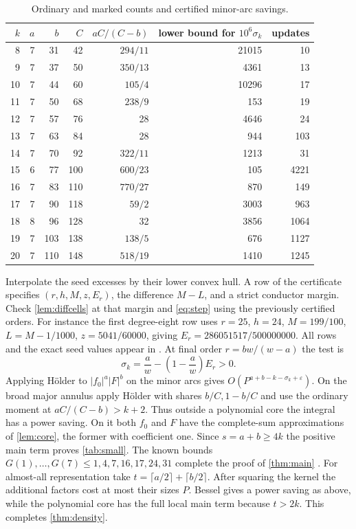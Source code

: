 \documentclass[11pt,letterpaper]{article}
\theoremstyle{definition}
\newcommand{\eps}{\varepsilon}
\begin{document}
\begin{table}[ht]
\centering\small
\begin{tabular}{rrrrrrr}
\toprule $k$&$a$&$b$&$C$&$aC/(C-b)$&lower bound for $10^6\sigma_k$&updates\\
\midrule
8&7&31&42&$294/11$&21015&10\\
9&7&37&50&$350/13$&4361&13\\
10&7&44&60&$105/4$&10296&17\\
11&7&50&68&$238/9$&153&19\\
12&7&57&76&28&4646&24\\
13&7&63&84&28&944&103\\
14&7&70&92&$322/11$&1213&31\\
15&6&77&100&$600/23$&105&4221\\
16&7&83&110&$770/27$&870&149\\
17&7&90&118&$59/2$&3003&963\\
18&8&96&128&32&3856&1064\\
19&7&103&138&$138/5$&676&1127\\
20&7&110&148&$518/19$&1410&1245\\
\bottomrule
\end{tabular}
\caption{Ordinary and marked counts and certified minor-arc savings.}
\label{tab:input}
\end{table}
Interpolate the seed excesses by their lower convex hull. A row of
the certificate specifies $(r,h,M,z,E_r)$, the difference $M-L$, and
a strict conductor margin. Check \cref{lem:diffcells} at that margin
and \eqref{eq:step} using the previously certified orders. For instance
the first degree-eight row uses $r=25$, $h=24$, $M=199/100$,
$L=M-1/1000$, $z=5041/60000$, giving $E_r=286051517/500000000$.
All rows and the exact seed values appear in \cite{cert}. At final
order $r=bw/(w-a)$ the test is
\[
 \sigma_k=\frac aw-\left(1-\frac aw\right)E_r>0.
\]
Applying H\"older to $|f_0|^a|F|^b$ on the minor arcs gives
$O(P^{a+b-k-\sigma_k+\eps})$. On the broad major annulus apply
H\"older with shares $b/C,1-b/C$ and use the ordinary moment at
$aC/(C-b)>k+2$. Thus outside a polynomial core the integral has a
power saving. On it both $f_0$ and $F$ have the complete-sum
approximations of \cref{lem:core}, the former with coefficient one.
Since $s=a+b\ge4k$ the positive main term proves \cref{tab:small}.
The known bounds $G(1),\ldots,G(7)\le1,4,7,16,17,24,31$ complete
the proof of \cref{thm:main} \cite{VWsurvey,W16}.
For almost-all representation take
$t=\lceil a/2\rceil+\lceil b/2\rceil$. After squaring the kernel the
additional factors cost at most their sizes $P$. Bessel gives a
power saving as above, while the polynomial core has the full local
main term because $t>2k$. This completes \cref{thm:density}.
\end{document}
